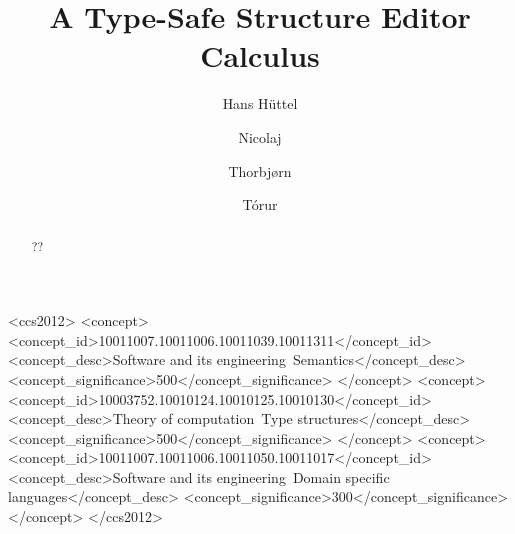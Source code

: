 \documentclass[sigplan,screen]{acmart}
\begin{document}

%
\title{A Type-Safe Structure Editor Calculus}
%
%


\author{Hans Hüttel}

  
\author{Nicolaj}
\email{}


\author{Thorbjørn}
\email{}


\author{Tórur}
\email{}

  

%
%
%

%
 \begin{abstract}
??
\end{abstract}

\begin{CCSXML}
<ccs2012>
<concept>
<concept_id>10011007.10011006.10011039.10011311</concept_id>
<concept_desc>Software and its engineering~Semantics</concept_desc>
<concept_significance>500</concept_significance>
</concept>
<concept>
<concept_id>10003752.10010124.10010125.10010130</concept_id>
<concept_desc>Theory of computation~Type structures</concept_desc>
<concept_significance>500</concept_significance>
</concept>
<concept>
<concept_id>10011007.10011006.10011050.10011017</concept_id>
<concept_desc>Software and its engineering~Domain specific languages</concept_desc>
<concept_significance>300</concept_significance>
</concept>
</ccs2012>
\end{CCSXML}
\end{document}
